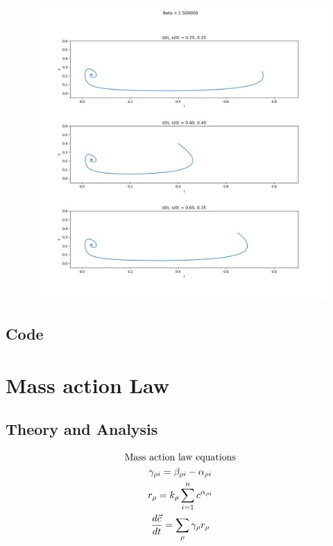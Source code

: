 \documentclass[11pt,a4paper]{CLabBookTemplate} %
\begin{document}
\begin{figure}[h!]
	\centering
	\includegraphics[width = 160mm]{Figures/Task1_6.png}
	\caption{}
	\label{fig:Task1_6}
\end{figure}





\clearpage
\subsection{Code}

\newpage
\section{Mass action Law}
\subsection{Theory and Analysis}
\begin{gather}
\textrm{Mass action law equations} \notag \\	
\label{Eq:MAL1}
\gamma_{\rho i} = \beta_{\rho i} - \alpha_{\rho i} \\
\label{Eq:MAL2}
r_{\rho} = k_{\rho}\sum_{i = 1}^{n} c^{\alpha_{\rho i}} \\
\label{Eq:MAL3}
\frac{d\vec{c}}{dt} = \sum_{\rho}\gamma_{\rho}r_{\rho}
\end{gather}
\end{document}
